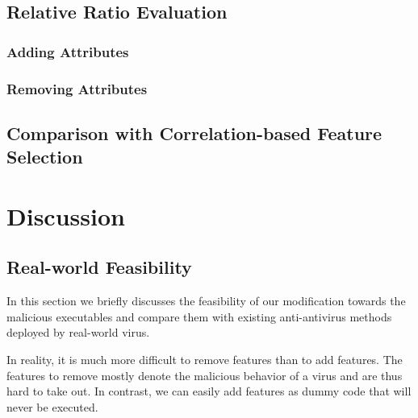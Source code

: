 \documentclass[11pt]{article}
\begin{document}



\subsection{Relative Ratio Evaluation}
\subsubsection{Adding Attributes}
\subsubsection{Removing Attributes}

\subsection{Comparison with Correlation-based Feature Selection}


\section{Discussion}

\subsection{Real-world Feasibility}
In this section we briefly discusses the feasibility of our modification towards the malicious executables and compare them with existing anti-antivirus methods deployed by real-world virus.

In reality, it is much more difficult to remove features than to add features. The features to remove mostly denote the malicious behavior of a virus and are thus hard to take out. In contrast, we can easily add features as dummy code that will never be executed.
\end{document}
